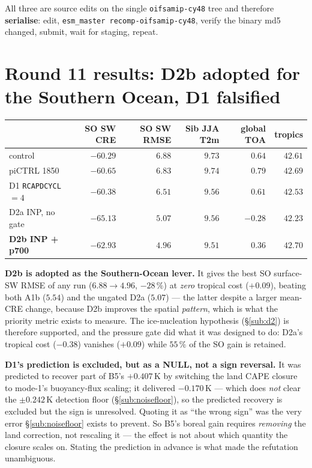 \documentclass[10pt]{article}
\begin{document}
All three are source edits on the single \texttt{oifsamip-cy48} tree and therefore \textbf{serialise}: edit,
\texttt{esm\_master recomp-oifsamip-cy48}, verify the binary md5 changed, submit, wait for staging, repeat.

\section{Round 11 results: D2b adopted for the Southern Ocean, D1 falsified}\label{sec:round11res}
\begin{center}\footnotesize
\begin{tabular}{l r r r r r}
\toprule
 & SO SW CRE & SO SW RMSE & Sib JJA T2m & global TOA & tropics \\
\midrule
control                    & $-60.29$ & $6.88$ & $9.73$ & $0.64$ & $42.61$ \\
piCTRL 1850                & $-60.65$ & $6.83$ & $9.74$ & $\mathbf{0.79}$ & $42.69$ \\
D1 \texttt{RCAPDCYCL}$=4$  & $-60.38$ & $6.51$ & $\mathbf{9.56}$ & $0.61$ & $42.53$ \\
D2a INP, no gate           & $\mathbf{-65.13}$ & $5.07$ & $9.56$ & $-0.28$ & $42.23$ \\
\textbf{D2b INP + p700}    & $-62.93$ & $\mathbf{4.96}$ & $9.51$ & $0.36$ & $\mathbf{42.70}$ \\
\bottomrule
\end{tabular}
\end{center}

\noindent\textbf{D2b is adopted as the Southern-Ocean lever.} It gives the best SO surface-SW
RMSE of any run ($6.88\to4.96$, $-28\,\%$) at \emph{zero} tropical cost ($+0.09$), beating both
A1b ($5.54$) and the ungated D2a ($5.07$) --- the latter despite a larger mean-CRE change,
because D2b improves the spatial \emph{pattern}, which is what the priority metric exists to
measure. The ice-nucleation hypothesis (\S\ref{sub:d2}) is therefore supported, and the
pressure gate did what it was designed to do: D2a's tropical cost ($-0.38$) vanishes ($+0.09$)
while $55\,\%$ of the SO gain is retained.

\textbf{D1's prediction is excluded, but as a NULL, not a sign reversal.} It was predicted to recover part of B5's $+0.407$\,K by
switching the land CAPE closure to mode-1's buoyancy-flux scaling; it delivered
$\mathbf{-0.170}$\,K --- which does \emph{not} clear the $\pm0.242$\,K detection floor
(\S\ref{sub:noisefloor}), so the predicted recovery is excluded but the sign is unresolved.
Quoting it as ``the wrong sign'' was the very error \S\ref{sub:noisefloor} exists to prevent. So B5's boreal gain requires \emph{removing} the land
correction, not rescaling it --- the effect is not about which quantity the closure scales on.
Stating the prediction in advance is what made the refutation unambiguous.
\end{document}
